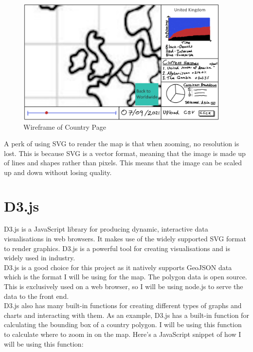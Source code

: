 \documentclass{report}
\begin{document}
\begin{center}
    \begin{figure}[h]
        \centering
        \includegraphics[width=0.95\textwidth]{Images/Country_Wireframe.png}
        \caption{Wireframe of Country Page}
        \label{fig:wireframe_country}
    \end{figure}
\end{center}
A perk of using SVG to render the map is that when zooming, no resolution is lost. This is because SVG is a vector format, meaning that the image is made up of lines and shapes rather than pixels. This means that the image can be scaled up and down without losing quality.
\section{D3.js}
D3.js is a JavaScript library for producing dynamic, interactive data visualisations in web browsers. It makes use of the widely supported SVG format to render graphics. D3.js is a powerful tool for creating visualisations and is widely used in industry.\\

D3.js is a good choice for this project as it natively supports GeoJSON data which is the format I will be using for the map. The polygon data is open source. \cite{geojsonvectormaps}\\

This is exclusively used on a web browser, so I will be using node.js to serve the data to the front end.\\

D3.js also has many built-in functions for creating different types of graphs and charts and interacting with them. As an example, D3.js has a built-in function for calculating the bounding box of a country polygon. I will be using this function to calculate where to zoom in on the map. Here's a JavaScript snippet of how I will be using this function:
\end{document}
